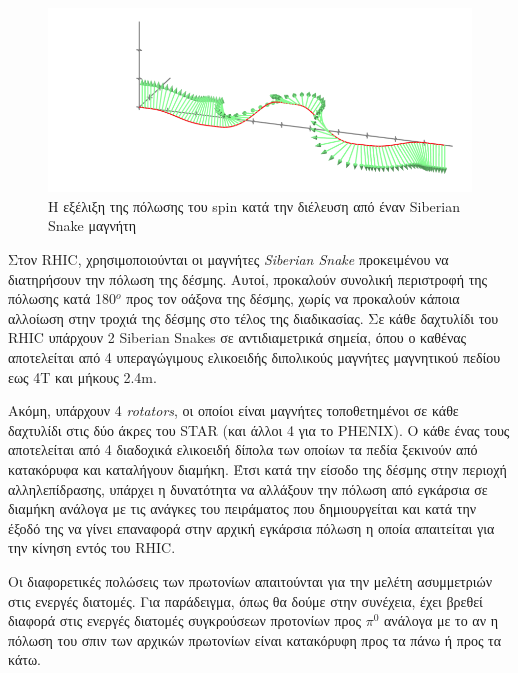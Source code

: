 		
	\begin{figure}[h!]
			\centering
			\includegraphics[scale=0.7]{Accelerating_System/traj_through_siberian}
			\caption{Η εξέλιξη της πόλωσης του spin κατά την διέλευση από έναν Siberian Snake μαγνήτη}
			\label{fig2.10}
		\end{figure}
		
	Στον RHIC, χρησιμοποιούνται οι μαγνήτες \textit{Siberian Snake} προκειμένου να διατηρήσουν την πόλωση της δέσμης.
	Αυτοί, προκαλούν συνολική περιστροφή της πόλωσης κατά 180$^o$ προς τον οάξονα της δέσμης, χωρίς να προκαλούν κάποια αλλοίωση στην τροχιά της δέσμης στο τέλος της διαδικασίας.
	Σε κάθε δαχτυλίδι του RHIC υπάρχουν 2 Siberian Snakes σε αντιδιαμετρικά σημεία, όπου ο καθένας αποτελείται από 4 υπεραγώγιμους ελικοειδής διπολικούς μαγνήτες μαγνητικού πεδίου εως 4Τ και μήκους 2.4m.

		
		
	Ακόμη, υπάρχουν 4 \textit{rotators}, οι οποίοι είναι μαγνήτες τοποθετημένοι σε κάθε δαχτυλίδι στις δύο άκρες του STAR (και άλλοι 4 για το PHENIX).
	Ο κάθε ένας τους αποτελείται από 4 διαδοχικά ελικοειδή δίπολα των οποίων τα πεδία ξεκινούν από κατακόρυφα και καταλήγουν διαμήκη. Έτσι κατά την είσοδο της δέσμης στην περιοχή αλληλεπίδρασης, υπάρχει η δυνατότητα να αλλάξουν την πόλωση από εγκάρσια σε διαμήκη ανάλογα με τις ανάγκες του πειράματος που δημιουργείται και κατά την έξοδό της να γίνει επαναφορά στην αρχική εγκάρσια πόλωση η οποία απαιτείται για την κίνηση εντός του RHIC.
	
	Οι διαφορετικές πολώσεις των πρωτονίων απαιτούνται για την μελέτη ασυμμετριών στις ενεργές διατομές. Για παράδειγμα, όπως θα δούμε στην συνέχεια, έχει βρεθεί διαφορά στις ενεργές διατομές συγκρούσεων προτονίων προς $\pi^0$ ανάλογα με το αν η πόλωση του σπιν των αρχικών πρωτονίων είναι κατακόρυφη προς τα πάνω ή προς τα κάτω.
	
	
		